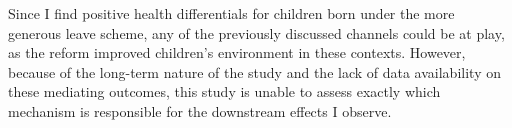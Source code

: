 


Since I find positive health differentials for children born under the more generous leave scheme, any of the previously discussed channels could be at play, as the reform improved children's environment in these contexts. However, because of the long-term nature of the study and the lack of data availability on these mediating outcomes, this study is unable to assess exactly which mechanism is responsible for the downstream effects I observe.









